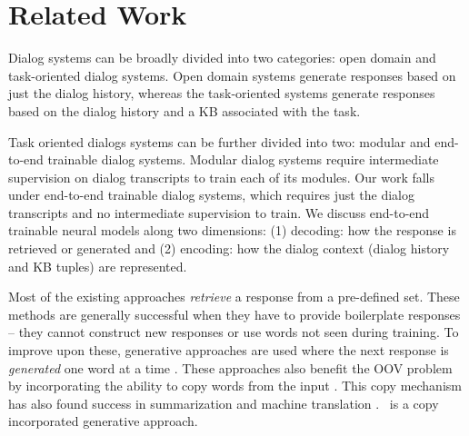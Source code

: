 \section{Related Work}

Dialog systems can be broadly divided into two categories: open domain \cite{vinyals2015neural,serban2016building} and task-oriented dialog systems. Open domain systems generate responses based on just the dialog history, whereas the task-oriented systems generate responses based on the dialog history and a KB associated with the task. 

Task oriented dialogs systems can be further divided into two: modular and end-to-end trainable dialog systems. Modular dialog systems \cite{wen2017network,williams2017hybrid,williams2007partially} require intermediate supervision on dialog transcripts to train each of its modules. Our work falls under end-to-end trainable dialog systems, which requires just the dialog transcripts and no intermediate supervision to train. We discuss end-to-end trainable neural models along two dimensions: (1) decoding: how the response is retrieved or generated and (2) encoding: how the dialog context (dialog history and KB tuples) are represented. 

Most of the existing approaches \cite{BordesW16,liu2017gated,seo2016query,wu2017end} {\em retrieve} a response from a pre-defined set. These methods are generally successful when they have to provide boilerplate responses -- they cannot construct new responses or use words not seen during training. 
To improve upon these, generative approaches are used where the next response is {\em generated} one word at a time \cite{eric2017copy,mem2seq}. These approaches also benefit the OOV problem by incorporating the ability to copy words from the input \cite{vinyals2015pointer,gu2016incorporating}. This copy mechanism has also found success in summarization \cite{nallapati2016abstractive,see2017get} and machine translation \cite{ptr-unk}. \sys\ is a copy incorporated generative approach.



